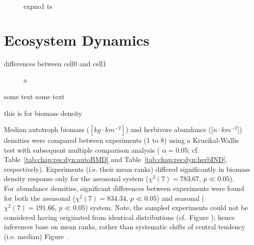 \begin{figure}
\centering

\caption[Body mass density time series for experiment 1]{expno1 ts}
\label{fig:chap:res:ts:expno1}
\end{figure}

\begin{figure}
\centering

\caption[ShortCap]{}
\label{fig:chap:res:tsinit}
\end{figure}


\section{Ecosystem Dynamics}
\label{chap:res:dyn} 
differences between cell0 and cell1

\begin{figure}
\centering

\caption[Average body mass (aseasonal system)]{a}
\label{fig:chap:res:dyn:c0}
\end{figure}


some text some text




this is for biomass density
%


Median autotroph biomass ($[kg\cdot km^{-2}]$) and herbivore abundance ($[n\cdot km^{-2}$]) densities were compared between experiments (1 to 8) using a Krusikal-Wallis test with subsequent multiple comparison analysis ( $\alpha = 0.05$; cf. Table~\ref{tab:chap:res:dyn:autoBMD} and Table~\ref{tab:chap:res:dyn:herbIND}, respectively). 
Experiments (i.e. their mean ranks) differed significantly in biomass density response only for the aseasonal  system ($\chi^{2}(7) = 783.67$, $p \ll 0.05$). 
\\
For abundance densities, significant differences between experiments were found for both the aseasonal ($\chi^{2}(7) = 834.34$, $p \ll 0.05$) and seasonal ($\chi^{2}(7) = 191.66$, $p \ll 0.05$) system. 
Note, the sampled experiments could not be considered having originated from identical distributions (cf.~Figure ); 
hence inferences base on mean ranks, rather than systematic shifts of central tendency (i.e. median) Figure~.

